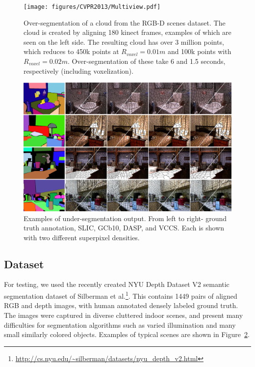 \begin{figure}
\begin{center}
\texttt{[image: figures/CVPR2013/Multiview.pdf]}
\end{center}
   \caption[Supervoxels from Multiple Views]{Over-segmentation of a cloud from the RGB-D scenes dataset\cite{RGBDDataset}. The cloud is created by aligning 180 kinect frames, examples of which are seen on the left side. The resulting cloud has over 3 million points, which reduces to 450k points at ${R}_{voxel}=0.01m$ and 100k points with ${R}_{voxel}=0.02m$. Over-segmentation of these take 6 and 1.5 seconds, respectively (including voxelization).}
\label{fig:MultiViewCloud}
\end{figure}

\begin{figure}
\begin{center}
\includegraphics[width=1.01\linewidth]{figures/CVPR2013/Comparison_Segmentation_Small.pdf}
\end{center}
   \caption[Superpixel Comparison]{Examples of under-segmentation output. From left to right- ground truth annotation, SLIC, GCb10, DASP, and VCCS. Each is shown with two different superpixel densities.}
\label{fig:ExampleSegmentations}
\end{figure}

\subsection{Dataset}
For testing, we used the recently created NYU Depth Dataset V2 semantic segmentation dataset of Silberman et al.\@ \cite{NYUDataset}\footnote{\url{http://cs.nyu.edu/~silberman/datasets/nyu_depth_v2.html}}. This contains 1449 pairs of aligned RGB and depth images, with human annotated densely labeled ground truth. The images were captured in diverse cluttered indoor scenes, and present many difficulties for segmentation algorithms such as varied illumination and many small similarly colored objects. Examples of typical scenes are shown in Figure~\ref{fig:ExampleSegmentations}.

